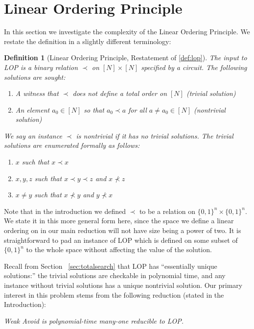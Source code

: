 \documentclass[11pt]{article}
\newtheorem*{theorem*}{Theorem}
\newtheorem*{definition*}{Definition}
\newcommand{\B}{\{0,1\}}
\begin{document}
\section{Linear Ordering Principle}\label{sec:lop}
In this section we investigate the complexity of the Linear Ordering Principle. We restate the definition in a slightly different terminology:
\begin{definition*}[Linear Ordering Principle, Restatement of \ref{def:lop}]
The input to LOP is a binary relation $\prec$ on $[N] \times [N]$ specified by a circuit. The following solutions are sought:
\begin{enumerate}
    \item A witness that $\prec$ does not define a total order on $[N]$ (trivial solution)
    \item An element $a_0 \in [N]$ so that $a_0 \prec a$ for all $a \neq a_0 \in [N]$ (nontrivial solution)
\end{enumerate}
We say an instance $\prec$ is nontrivial if it has no trivial solutions. The trivial solutions are enumerated formally as follows:
\begin{enumerate}[leftmargin=8.5\parindent]
    \item[\textbf{Antireflexivity Violation:}] $x$ such that $x \prec x$
    \item[\textbf{Transitivity Violation:}] $x,y,z$ such that $x \prec y \prec z$ and $x \not\prec z$
    \item[\textbf{Totality Violation:}] $x\neq y$ such that $x \not\prec y$ and $y \not\prec x$
\end{enumerate}
\end{definition*}
Note that in the introduction we defined $\prec$ to be a relation on $\B^n \times \B^n$. We state it in this more general form here, since the space we define a linear ordering on in our main reduction will not have size being a power of two. It is straightforward to pad an instance of LOP which is defined on some subset of $\B^n$ to the whole space without affecting the value of the solution.

Recall from Section ~\ref{sec:totalsearch}
that LOP has ``essentially unique solutions:'' the trivial solutions are checkable in polynomial time, and any instance without trivial solutions has a unique nontrivial solution. Our primary interest in this problem stems from the following reduction (stated in the Introduction):
\medskip

{\it Weak Avoid is polynomial-time many-one reducible to LOP.}
\end{document}

